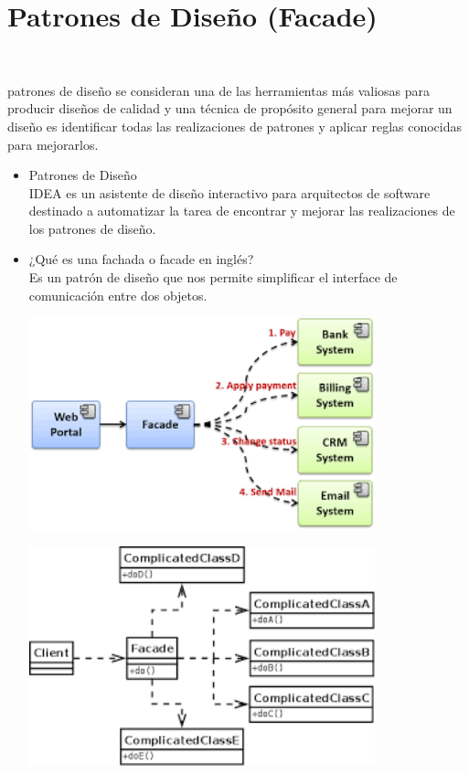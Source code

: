 \section{Patrones de Diseño (Facade)} 
\textbf{}\\
\begin{flushleft}
patrones de diseño se consideran una de las herramientas más valiosas para producir diseños de calidad y una técnica de propósito general para mejorar un diseño es identificar todas las realizaciones de patrones y aplicar reglas conocidas para mejorarlos.

\begin{itemize}
	\item Patrones de Diseño
	\\IDEA es un asistente de diseño interactivo para arquitectos de software destinado a automatizar la tarea de encontrar y mejorar las realizaciones de los patrones de diseño.


	


	\item ¿Qué es una fachada o facade en inglés?
	\\ Es un patrón de diseño que nos permite simplificar el interface de comunicación entre dos objetos.
	\begin{center}
	\includegraphics[width=10cm]{./Imagenes/1} 
	\end{center}

	
	\begin{center}
	\includegraphics[width=10cm]{./Imagenes/2} 
	\end{center}



\end{itemize}
\end{flushleft}
